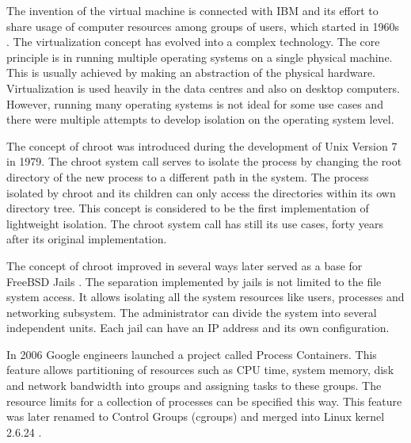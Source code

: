 \documentclass[
  digital, %
  twoside, %
  table,   %
  lof,     %
  lot,     %
]{fithesis3}
\begin{document}
The invention of the virtual machine is connected with IBM and its effort to share usage of computer resources among groups of users, which started in 1960s \cite{vm_history}. The virtualization concept has evolved into a complex technology. The core principle is in running multiple operating systems on a single physical machine. This is usually achieved by making an abstraction of the physical hardware. Virtualization is used heavily in the data centres and also on desktop computers. However, running many operating systems is not ideal for some use cases and there were multiple attempts to develop isolation on the operating system level.

The concept of chroot \cite{chroot} was introduced during the development of Unix Version 7 in 1979. The chroot system call serves to isolate the process by changing the root directory of the new process to a different path in the system. The process isolated by chroot and its children can only access the directories within its own directory tree. This concept is considered to be the first implementation of lightweight isolation. The chroot system call has still its use cases, forty years after its original implementation.

The concept of chroot improved in several ways later served as a base for FreeBSD Jails \cite{freebsd_jails}. The separation implemented by jails is not limited to the file system access. It allows isolating all the system resources like users, processes and networking subsystem. The administrator can divide the system into several independent units. Each jail can have an IP address and its own configuration.

In 2006 Google engineers launched a project called Process Containers. This feature allows partitioning of resources such as CPU time, system memory, disk and network bandwidth into groups and assigning tasks to these groups. The resource limits for a collection of processes can be specified this way. This feature was later renamed to Control Groups (cgroups) and merged into Linux kernel 2.6.24 \cite{cgroups}.
\end{document}
